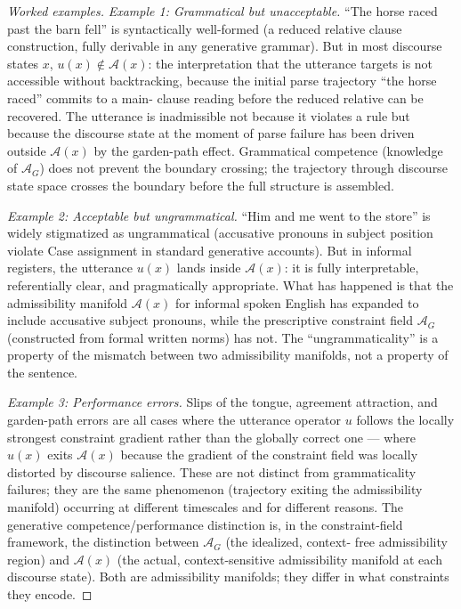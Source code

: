 \documentclass[11pt, a4paper]{article}
\theoremstyle{definition}
\theoremstyle{remark}
\begin{document}
\begin{proof}[Worked examples]
\textit{Example 1: Grammatical but unacceptable.}
``The horse raced past the barn fell'' is syntactically well-formed (a reduced
relative clause construction, fully derivable in any generative grammar).
But in most discourse states $x$, $u(x) \notin \mathcal{A}(x)$: the
interpretation that the utterance targets is not accessible without backtracking,
because the initial parse trajectory ``the horse raced'' commits to a main-
clause reading before the reduced relative can be recovered. The utterance is
inadmissible not because it violates a rule but because the discourse state at
the moment of parse failure has been driven outside $\mathcal{A}(x)$ by the
garden-path effect. Grammatical competence (knowledge of $\mathcal{A}_G$) does
not prevent the boundary crossing; the trajectory through discourse state space
crosses the boundary before the full structure is assembled.

\textit{Example 2: Acceptable but ungrammatical.}
``Him and me went to the store'' is widely stigmatized as ungrammatical
(accusative pronouns in subject position violate Case assignment in standard
generative accounts). But in informal registers, the utterance $u(x)$ lands
inside $\mathcal{A}(x)$: it is fully interpretable, referentially clear, and
pragmatically appropriate. What has happened is that the admissibility manifold
$\mathcal{A}(x)$ for informal spoken English has expanded to include accusative
subject pronouns, while the prescriptive constraint field $\mathcal{A}_G$
(constructed from formal written norms) has not. The ``ungrammaticality'' is
a property of the mismatch between two admissibility manifolds, not a property
of the sentence.

\textit{Example 3: Performance errors.}
Slips of the tongue, agreement attraction, and garden-path errors are all
cases where the utterance operator $u$ follows the locally strongest constraint
gradient rather than the globally correct one --- where $u(x)$ exits
$\mathcal{A}(x)$ because the gradient of the constraint field was locally
distorted by discourse salience. These are not distinct from grammaticality
failures; they are the same phenomenon (trajectory exiting the admissibility
manifold) occurring at different timescales and for different reasons. The
generative competence/performance distinction is, in the constraint-field
framework, the distinction between $\mathcal{A}_G$ (the idealized, context-
free admissibility region) and $\mathcal{A}(x)$ (the actual, context-sensitive
admissibility manifold at each discourse state). Both are admissibility
manifolds; they differ in what constraints they encode.
\end{proof}
\end{document}

